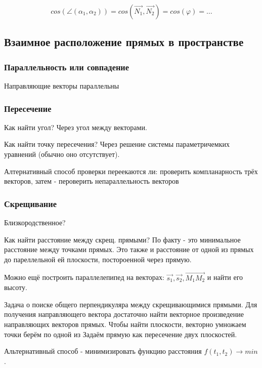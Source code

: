 \documentclass[12pt, a4paper]{article}
\begin{document}
    \begin{equation}
        cos(\angle(\alpha_1, \alpha_2)) = cos(\vec{N_1}, \vec{N_2}) = cos(\varphi) = \dots
    \end{equation}



    \subsection{Взаимное расположение прямых в пространстве}
    
    \subsubsection{Параллельность или совпадение}

    Направляющие векторы параллельны

    \subsubsection{Пересечение}

    Как найти угол? Через угол между векторами.

    Как найти точку пересечения? Через решение системы параметричемких уравнений (обычно оно отсутствует).

    Алтернативный способ проверки переекаются ли: проверить компланарность трёх векторов, 
    затем - пероверить непараллельность векторов

    \subsubsection{Скрещивание}
    Близкородственное?

    Как найти расстояние между скрещ. прямыми? По факту - это минимальное расстояние между точками прямых.
    Это также и расстояние от одной из прямых до пареллельной ей плоскости, постороенной через прямую.

    Можно ещё построить параллелепипед на векторах: $\vec{s_1}, \vec{s_2}, \vec{M_1 M_2}$ и найти его высоту.

    Задача о поиске общего перпендикуляра между скрещивающимися прямыми.
    Для получения направляющего вектора достаточно найти векторное произведение направляющих векторов прямых.
    Чтобы найти плоскости, векторно умножаем точки берём по одной из 
    Задаём прямую как пересечение двух плоскостей.

    Альтернативный способ - минимизировать функцию расстояния $f(t_1, t_2) \to min$.
\end{document}
